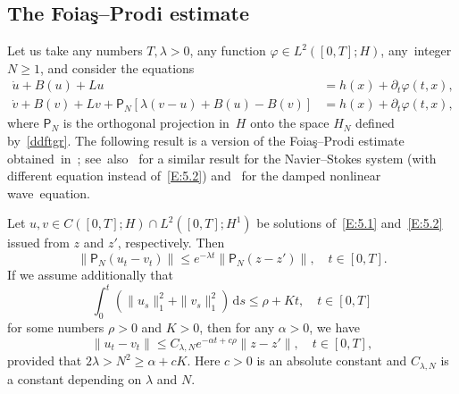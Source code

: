 \documentclass[10pt]{amsart}
\theoremstyle{definition}\newtheorem{defi}[theo]{Definition}\newtheorem{rema}[theo]{Remark}\newtheorem{exam}[theo]{Example}\newtheorem{exem}[theo]{Example}\newtheorem{nota}[theo]{Notation}
\newcommand{\p}{\partial}
\newcommand{\la}{\lambda}
\newcommand{\pp}{{{\mathsf P}_N}}
\newcommand{\dd}{\mathrm{d}}
\begin{document}
\subsection{The Foia\c{s}--Prodi estimate}

Let us take any numbers $T, \lambda>0$, any function $\varphi \in L^2([0,T]; H)$, any~integer $N\ge1$, and consider the equations
\begin{align}
\dot u+B(u)+Lu &=h(x)+\p_t\varphi(t,x),\label{E:5.1}\\
\dot v+B(v)+Lv+{\mathsf P}_N[\la(v-u)+B(u)-B(v)]&=h(x)+\p_t\varphi(t,x),\label{E:5.2}
\end{align}
where $\pp$ is the orthogonal projection in~$H$ onto the space $H_N$ defined by~\eqref{ddftgr}. The following result is a version of the Foia\c{s}--Prodi estimate obtained~in~\cite{FP-1967}; see~also~\cite[Section~2.1.8]{KS-book} for a similar result for the Navier--Stokes system (with different equation instead of~\eqref{E:5.2}) and~\cite[Section~7.3]{MN-2015} for the damped nonlinear wave~equation.

\begin{prop}\label{4.13}
Let $u,v\in C([0,T];H) \cap L^2([0,T];H^1) $ be solutions of~\eqref{E:5.1} and~\eqref{E:5.2} issued from $z$ and $z'$, respectively. Then
\begin{equation}\label{FPE1}
\|\pp(u_t-v_t)\| \le e^{- \la t}\|\pp(z-z') \|, \quad t\in [0,T].
\end{equation}
If we assume additionally that
\begin{equation}\label{4.17}
\int_0^t(\| u_s\|_1^2+\| v_s\|_1^2)\,\dd s\le \rho+Kt, \quad t\in [0,T]
\end{equation}
for some numbers $\rho>0$ and $K>0$, then for any $\alpha >0$, we have
\begin{equation}\label{4.16}
\|u_t-v_t \|\leq C_{\la,N} e^{-\alpha t+c \rho}\|z-z'\|, \quad t\in [0,T],
\end{equation}
provided that $2\la> N^2\ge \alpha +cK$. Here $c>0$ is an absolute constant and $C_{\la,N}$ is a constant depending on $\la$ and $N$.
\end{prop}
\end{document}
